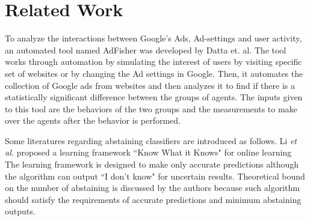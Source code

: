 \documentclass[12pt, journal]{IEEEtran}
\begin{document}
%



\section{Related Work}
To analyze the interactions between Google's Ads, Ad-settings and user activity, an automated tool named AdFisher \cite{datta} was developed by Datta et. al. The tool works through automation by simulating the interest of users by visiting specific set of websites or by changing the Ad settings in Google. Then, it automates the collection of Google ads from websites and then analyzes it to find if there is a statistically significant difference between the groups of agents. The inputs given to this tool are the behaviors of the two groups and the measurements to make over the agents after the behavior is performed.



Some literatures regarding abstaining classifiers are introduced as follows.
Li \textit{et al.} proposed a learning framework ``Know What it Knows" \cite{KWIK} for online learning
The learning framework is designed to make only accurate predictions although the algorithm can output ``I don't know" for uncertain results.
Theoretical bound on the number of abstaining is discussed by the authors because such algorithm should satisfy the requirements of accurate predictions and minimum abstaining outputs. 
\end{document}
